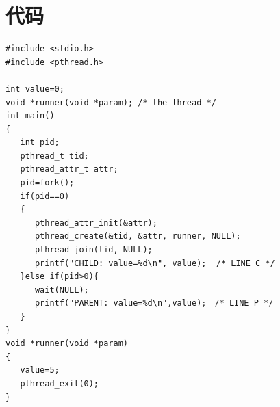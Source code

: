 \documentclass[
	12pt, %
	cn, %
]{mwhw}
\begin{document}
\section{代码}
\begin{lstlisting}
#include <stdio.h>
#include <pthread.h>

int value=0;
void *runner(void *param); /* the thread */
int main()
{
   int pid;
   pthread_t tid;
   pthread_attr_t attr;
   pid=fork();
   if(pid==0)
   {
      pthread_attr_init(&attr);
      pthread_create(&tid, &attr, runner, NULL);
      pthread_join(tid, NULL);
      printf("CHILD: value=%d\n", value);  /* LINE C */
   }else if(pid>0){
      wait(NULL);
      printf("PARENT: value=%d\n",value);　/* LINE P */
   }
}
void *runner(void *param)
{
   value=5;
   pthread_exit(0);
}
\end{lstlisting}
\end{document}
